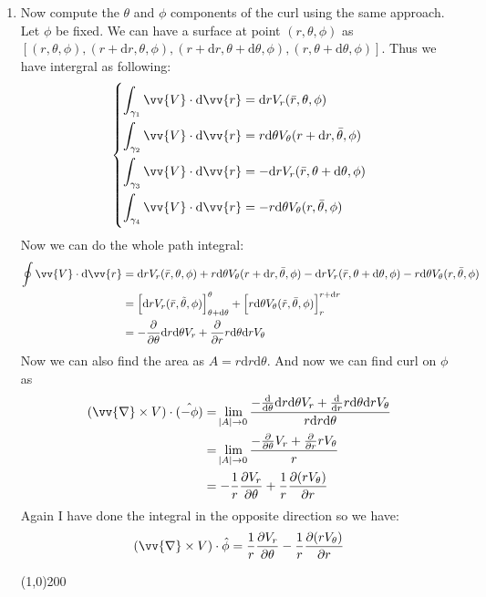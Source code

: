 \documentclass{article}
\newcommand{\de}{\mathrm{d}}
\begin{document}
\begin{enumerate}
\begin{enumerate}
        \item Now compute the $\theta$ and $\phi$ components of the curl using the same approach.\\

        Let $\phi$ be fixed. We can have a surface at point $(r,\theta,\phi)$ as $[(r,\theta,\phi), (r+\de r, \theta,\phi),(r+\de r, \theta + \de \theta,\phi), (r,\theta + \de \theta,\phi)]$. Thus we have intergral as following:
        \[
        \left\{
        \begin{aligned}
        \int_{\gamma_1} \vv{V} \cdot \de \vv{r} &= \de r V_r(\bar{r},\theta,\phi)\\
        \int_{\gamma_2} \vv{V} \cdot \de \vv{r} &= r \de \theta V_\theta(r+\de r, \bar{\theta},\phi)\\
        \int_{\gamma_3} \vv{V} \cdot \de \vv{r} &= -\de r V_r(\bar{r},\theta + \de \theta,\phi)\\
        \int_{\gamma_4} \vv{V} \cdot \de \vv{r} &= -r\de \theta V_\theta(r,\bar{\theta},\phi)
        \end{aligned}
        \right.
        \]
        Now we can do the whole path integral:
        \begin{align*}
            \oint \vv{V} \cdot \de \vv{r} &= \de r V_r(\bar{r},\theta,\phi) + r \de \theta V_\theta(r+\de r, \bar{\theta},\phi) -\de r V_r(\bar{r},\theta + \de \theta,\phi) -r\de \theta V_\theta(r,\bar{\theta},\phi)\\
            &= \left[\de r V_r(\bar{r},\tilde{\theta},\phi)\right]_{\theta + \de \theta}^\theta +
               \left[r\de\theta V_\theta (\tilde{r},\bar{\theta},\phi)\right]_r^{r+\de r}\\
            &= -\frac{\partial}{\partial \theta} \de r \de \theta V_r + 
            \frac{\partial}{\partial r} r\de\theta \de r V_\theta
        \end{align*}
        Now we can also find the area as $A = r\de r \de \theta$. And now we can find curl on $\phi$ as 
        \begin{align*}
            (\vv{\nabla}\times V)\cdot \hat{(-\phi)} &= \lim_{\abs{A}\rightarrow0}\frac{-\frac{\de}{\de \theta} \de r \de \theta V_r + \frac{\de}{\de r} r\de\theta \de r V_\theta}{r\de r \de \theta} \\
            &= \lim_{\abs{A}\rightarrow0}\frac{-\frac{\partial}{\partial \theta}  V_r + \frac{\partial}{\partial r} r V_\theta}{r} \\
            &= -\frac{1}{r}\frac{\partial V_r}{\partial\theta} + \frac{1}{r}\frac{\partial (r V_\theta)}{\partial r}
        \end{align*}
        Again I have done the integral in the opposite direction so we have:
        \[
        (\vv{\nabla}\times V)\cdot \hat{\phi} = \frac{1}{r}\frac{\partial V_r}{\partial\theta} -\frac{1}{r}\frac{\partial (r V_\theta)}{\partial r}
        \]
        \begin{center}
            \line(1,0){200}
        \end{center}



\end{enumerate}
\end{enumerate}
\end{document}
